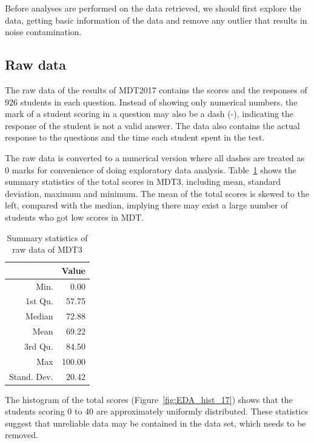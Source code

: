 \documentclass[a4paper]{report}
\begin{document}
Before analyses are performed on the data retrieved, we should first explore the data, getting basic information of the data and remove any outlier that results in noise contamination. 

\subsection{Raw data}

The raw data of the results of MDT2017 contains the scores and the responses of 926 students in each question. Instead of showing only numerical numbers, the mark of a student scoring in a question may also be a dash (-), indicating the response of the student is not a valid answer. The data also contains the actual response to the questions and the time each student spent in the test. 

The raw data is converted to a numerical version where all dashes are treated as 0 marks for convenience of doing exploratory data analysis. Table~\ref{tab:EDA_dsc_17} shows the summary statistics of the total scores in MDT3, including mean, standard deviation, maximum and minimum. The mean of the total scores is skewed to the left, compared with the median, implying there may exist a large number of students who got low scores in MDT. 

\begin{table}[ht]
  \centering
  \begin{tabular}{rr}
    \hline
 & Value \\ 
  \hline
Min. & 0.00 \\ 
  1st Qu. & 57.75 \\ 
  Median & 72.88 \\ 
  Mean & 69.22 \\ 
  3rd Qu. & 84.50 \\ 
  Max & 100.00 \\ 
  Stand. Dev. & 20.42 \\ 
   \hline
  \end{tabular}
  \caption{\label{tab:EDA_dsc_17}Summary statistics of raw data of MDT3}
\end{table}

The histogram of the total scores (Figure~\ref{fig:EDA_hist_17}) shows that the students scoring 0 to 40 are approximately uniformly distributed. These statistics suggest that unreliable data may be contained in the data set, which needs to be removed. 
\end{document}

